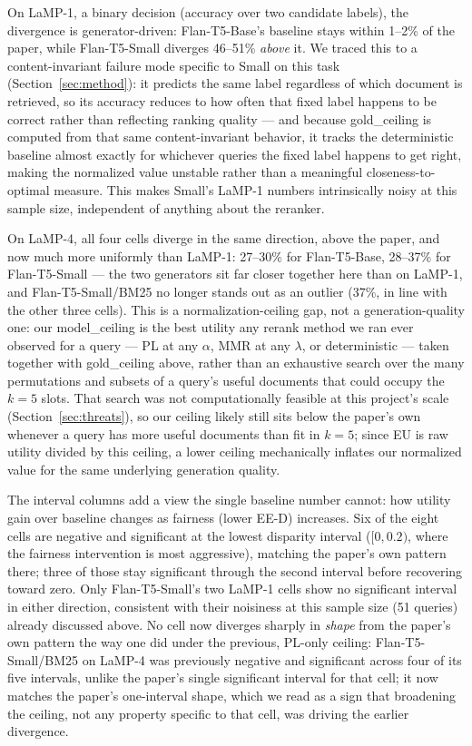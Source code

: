 \documentclass[10pt,twocolumn]{article}
\begin{document}
On LaMP-1, a binary decision (accuracy over two candidate labels), the divergence is
generator-driven: Flan-T5-Base's baseline stays within 1--2\% of the paper, while
Flan-T5-Small diverges 46--51\% \emph{above} it. We traced this to a
content-invariant failure mode specific to Small on this task (Section~\ref{sec:method}):
it predicts the same label regardless of which document is retrieved, so its accuracy
reduces to how often that fixed label happens to be correct rather than reflecting
ranking quality --- and because gold\_ceiling is computed from that same
content-invariant behavior, it tracks the deterministic baseline almost exactly for
whichever queries the fixed label happens to get right, making the normalized value
unstable rather than a meaningful closeness-to-optimal measure. This makes Small's
LaMP-1 numbers intrinsically noisy at this sample size, independent of anything about
the reranker.

On LaMP-4, all four cells diverge in the same direction, above the paper, and now
much more uniformly than LaMP-1: 27--30\% for Flan-T5-Base, 28--37\% for
Flan-T5-Small --- the two generators sit far closer together here than on LaMP-1,
and Flan-T5-Small/BM25 no longer stands out as an outlier (37\%, in line with the
other three cells). This is a normalization-ceiling gap, not a generation-quality
one: our model\_ceiling is the best utility any rerank method we ran ever observed
for a query --- PL at any $\alpha$, MMR at any $\lambda$, or deterministic ---
taken together with gold\_ceiling above, rather than an exhaustive search over the
many permutations and subsets of a query's useful documents that could occupy the
$k{=}5$ slots. That search was not computationally feasible at this project's scale
(Section~\ref{sec:threats}), so our ceiling likely still sits below the paper's own
whenever a query has more useful documents than fit in $k{=}5$; since EU is raw
utility divided by this ceiling, a lower ceiling mechanically inflates our
normalized value for the same underlying generation quality.

The interval columns add a view the single baseline number cannot: how utility gain
over baseline changes as fairness (lower EE-D) increases. Six of the eight cells are
negative and significant at the lowest disparity interval ($[0,0.2)$, where the
fairness intervention is most aggressive), matching the paper's own pattern there;
three of those stay significant through the second interval before recovering
toward zero. Only Flan-T5-Small's two LaMP-1 cells show no significant interval in
either direction, consistent with their noisiness at this sample size (51 queries)
already discussed above. No cell now diverges sharply in \emph{shape} from the
paper's own pattern the way one did under the previous, PL-only ceiling:
Flan-T5-Small/BM25 on LaMP-4 was previously negative and significant across four of
its five intervals, unlike the paper's single significant interval for that cell;
it now matches the paper's one-interval shape, which we read as a sign that
broadening the ceiling, not any property specific to that cell, was driving the
earlier divergence.
\end{document}
